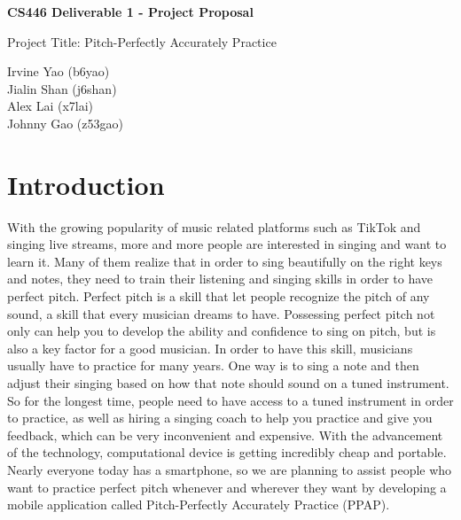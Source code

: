 \documentclass{article}
\author{Irvine Yao (b6yao)\\Jialin Shan (j6shan)\\Alex Lai (x7lai)\\Johnny Gao (z53gao)}
\begin{document}
\begin{titlepage}
  \begin{center}
    \Large\textbf{CS446 Deliverable 1 - Project Proposal}
   \vspace{50px}

    \Large{Project Title: Pitch-Perfectly Accurately Practice}
   \vspace{50px}

    \large{Irvine Yao (b6yao)\\Jialin Shan (j6shan)\\Alex Lai (x7lai)\\Johnny Gao (z53gao)}
  \end{center}
  
\end{titlepage}
  
\section{Introduction}
With the growing popularity of music related platforms such as TikTok and singing live streams, more and more people are interested in singing and want to learn it. Many of them realize that in order to sing beautifully on the right keys and notes, they need to train their listening and singing skills in order to have perfect pitch. Perfect pitch is a skill that let people recognize the pitch of any sound, a skill that every musician dreams to have. Possessing perfect pitch not only can help you to develop the ability and confidence to sing on pitch, but is also a key factor for a good musician. In order to have this skill, musicians usually have to practice for many years. One way is to sing a note and then adjust their singing based on how that note should sound on a tuned instrument. So for the longest time, people need to have access to a tuned instrument in order to practice, as well as hiring a singing coach to help you practice and give you feedback, which can be very inconvenient and expensive. With the advancement of the technology, computational device is getting incredibly cheap and portable. Nearly everyone today has a smartphone, so we are planning to assist people who want to practice perfect pitch whenever and wherever they want by developing a mobile application called Pitch-Perfectly Accurately Practice (PPAP). 
\end{document}
